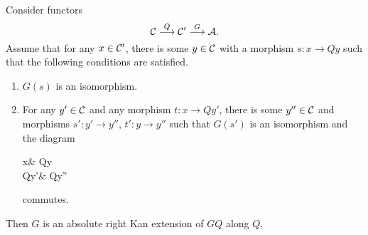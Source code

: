 \begin{lemma}\label{lemma:kan-extension-criterion}
	Consider functors
	\[ \mathcal{C}\overset{Q}{\longrightarrow}\mathcal{C}'\overset{G}{\longrightarrow}\mathcal{A}. \]
	Assume that for any \(x\in\mathcal{C}'\), there is some \(y\in\mathcal{C}\) with a morphism \(s\!:x\to Qy\) such that the following conditions are satisfied.
	\begin{enumerate}[label=(\alph*)]
	\item \(G(s)\) is an isomorphism.
	\item For any \(y'\in\mathcal{C}\) and any morphism \(t\!:x\to Qy'\), there is some \(y''\in\mathcal{C}\) and morphisms \(s'\!:y'\to y''\), \(t'\!:y\to y''\) such that \(G(s')\) is an isomorphism and the diagram
	\begin{diagram*}
		x\ar[r,"s"]\ar[d,"t"'] & Qy\ar[d,"Qt'"] \\
		Qy'\ar[r,"Qs'"] & Qy''
	\end{diagram*}
	commutes.
	\end{enumerate}
	Then \(G\) is an absolute right Kan extension of \(GQ\) along \(Q\).
\end{lemma}

